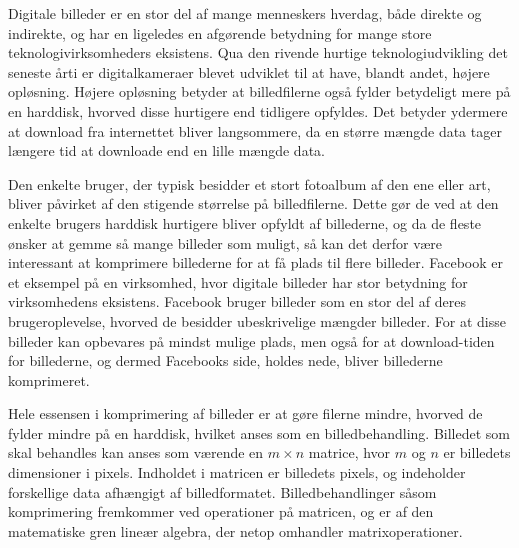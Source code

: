 Digitale billeder er en stor del af mange menneskers hverdag, både direkte og indirekte, og har en ligeledes en afgørende betydning for mange store teknologivirksomheders eksistens. Qua den rivende hurtige teknologiudvikling det seneste årti er digitalkameraer blevet udviklet til at have, blandt andet, højere opløsning. Højere opløsning betyder at billedfilerne også fylder betydeligt mere på en harddisk, hvorved disse hurtigere end tidligere opfyldes. Det betyder ydermere at download fra internettet bliver langsommere, da en større mængde data tager længere tid at downloade end en lille mængde data.

Den enkelte bruger, der typisk besidder et stort fotoalbum af den ene eller art, bliver påvirket af den stigende størrelse på billedfilerne. Dette gør de ved at den enkelte brugers harddisk hurtigere bliver opfyldt af billederne, og da de fleste ønsker at gemme så mange billeder som muligt, så kan det derfor være interessant at komprimere billederne for at få plads til flere billeder.
Facebook er et eksempel på en virksomhed, hvor digitale billeder har stor betydning for virksomhedens eksistens. Facebook bruger billeder som en stor del af deres brugeroplevelse, hvorved de besidder ubeskrivelige mængder billeder. For at disse billeder kan opbevares på mindst mulige plads, men også for at download-tiden for billederne, og dermed Facebooks side, holdes nede, bliver billederne komprimeret. 

Hele essensen i komprimering af billeder er at gøre filerne mindre, hvorved de fylder mindre på en harddisk, hvilket anses som en billedbehandling. Billedet som skal behandles kan anses som værende en $m \times n$ matrice, hvor $m$ og $n$ er billedets dimensioner i pixels. Indholdet i matricen er billedets pixels, og indeholder forskellige data afhængigt af billedformatet. Billedbehandlinger såsom komprimering fremkommer ved operationer på matricen, og er af den matematiske gren lineær algebra, der netop omhandler matrixoperationer.

